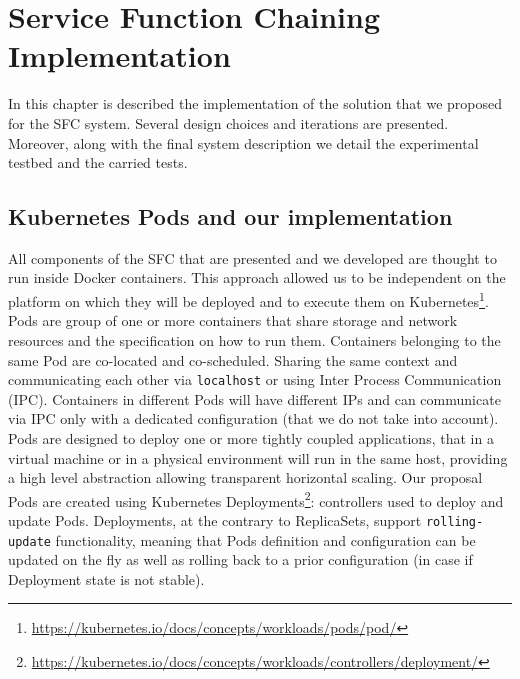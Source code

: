 \chapter{Service Function Chaining Implementation}
\label{chap:impl}

\newcommand{\enchainer}{\texttt{Enchainer}}
\newcommand{\vnf}{\texttt{VNF}}
\newcommand{\vnfs}{\texttt{VNFs}}
\newcommand{\dispatcher}{\texttt{Dispatcher}}
\newcommand{\astaire}{\texttt{Astaire}}
\newcommand{\ironhide}{\texttt{Ironhide}}
\newcommand{\harbor}{\texttt{Harbor}}
\newcommand{\roulette}{\texttt{Roulette}}
\newcommand{\ingress}{\texttt{ingress}}
\newcommand{\ingresses}{\texttt{ingresses}}
\newcommand{\egress}{\texttt{egress}}
\newcommand{\egresses}{\texttt{egresses}}

In this chapter is described the implementation of the solution that we
proposed for the SFC system. Several design choices and iterations are
presented. Moreover, along with the final system description we detail the
experimental testbed and the carried tests. 

\section{Kubernetes Pods and our implementation}
All components of the SFC that are presented and we developed are thought to
run inside Docker containers. This approach allowed us to be independent on the
platform on which they will be deployed and to execute them on
Kubernetes\footnote{\url{https://kubernetes.io/docs/concepts/workloads/pods/pod/}}.
Pods are group of one or more containers that share storage and network
resources and the specification on how to run them. Containers belonging to the
same Pod are co-located and co-scheduled. Sharing the same context and
communicating each other via \texttt{localhost} or using Inter Process
Communication (IPC). Containers in different Pods will have
different IPs and can communicate via IPC only with a dedicated configuration
(that we do not take into account). Pods are designed to deploy one or
more tightly coupled applications, that in a virtual machine or in a
physical environment will run in the same host, providing a high level
abstraction allowing transparent horizontal scaling. Our proposal Pods are
created using Kubernetes
Deployments\footnote{\url{https://kubernetes.io/docs/concepts/workloads/controllers/deployment/}}:
controllers used to deploy and update Pods. Deployments, at the contrary to
ReplicaSets, support \texttt{rolling-update} functionality, meaning
that Pods definition and configuration can be updated on the fly as well as
rolling back to a prior configuration (in case if Deployment state is
not stable).


